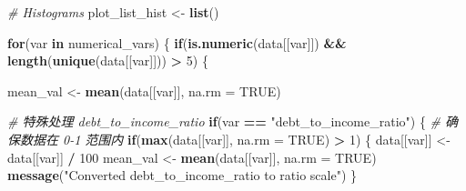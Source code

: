\documentclass[
]{article}
\newenvironment{Shaded}{\begin{snugshade}}{\end{snugshade}}
\newcommand{\AttributeTok}[1]{\textcolor[rgb]{0.13,0.29,0.53}{#1}}
\newcommand{\CommentTok}[1]{\textcolor[rgb]{0.56,0.35,0.01}{\textit{#1}}}
\newcommand{\ConstantTok}[1]{\textcolor[rgb]{0.56,0.35,0.01}{#1}}
\newcommand{\ControlFlowTok}[1]{\textcolor[rgb]{0.13,0.29,0.53}{\textbf{#1}}}
\newcommand{\DecValTok}[1]{\textcolor[rgb]{0.00,0.00,0.81}{#1}}
\newcommand{\FunctionTok}[1]{\textcolor[rgb]{0.13,0.29,0.53}{\textbf{#1}}}
\newcommand{\NormalTok}[1]{#1}
\newcommand{\OtherTok}[1]{\textcolor[rgb]{0.56,0.35,0.01}{#1}}
\newcommand{\SpecialCharTok}[1]{\textcolor[rgb]{0.81,0.36,0.00}{\textbf{#1}}}
\newcommand{\StringTok}[1]{\textcolor[rgb]{0.31,0.60,0.02}{#1}}
\begin{document}
\begin{Shaded}
\begin{Highlighting}[]
\CommentTok{\# Histograms}
\NormalTok{plot\_list\_hist }\OtherTok{\textless{}{-}} \FunctionTok{list}\NormalTok{()}

\ControlFlowTok{for}\NormalTok{(var }\ControlFlowTok{in}\NormalTok{ numerical\_vars) \{}
  \ControlFlowTok{if}\NormalTok{(}\FunctionTok{is.numeric}\NormalTok{(data[[var]]) }\SpecialCharTok{\&\&} \FunctionTok{length}\NormalTok{(}\FunctionTok{unique}\NormalTok{(data[[var]])) }\SpecialCharTok{\textgreater{}} \DecValTok{5}\NormalTok{) \{}
    
\NormalTok{    mean\_val }\OtherTok{\textless{}{-}} \FunctionTok{mean}\NormalTok{(data[[var]], }\AttributeTok{na.rm =} \ConstantTok{TRUE}\NormalTok{)}
    
    \CommentTok{\# 特殊处理 debt\_to\_income\_ratio}
    \ControlFlowTok{if}\NormalTok{(var }\SpecialCharTok{==} \StringTok{"debt\_to\_income\_ratio"}\NormalTok{) \{}
      \CommentTok{\# 确保数据在 0{-}1 范围内}
      \ControlFlowTok{if}\NormalTok{(}\FunctionTok{max}\NormalTok{(data[[var]], }\AttributeTok{na.rm =} \ConstantTok{TRUE}\NormalTok{) }\SpecialCharTok{\textgreater{}} \DecValTok{1}\NormalTok{) \{}
\NormalTok{        data[[var]] }\OtherTok{\textless{}{-}}\NormalTok{ data[[var]] }\SpecialCharTok{/} \DecValTok{100}
\NormalTok{        mean\_val }\OtherTok{\textless{}{-}} \FunctionTok{mean}\NormalTok{(data[[var]], }\AttributeTok{na.rm =} \ConstantTok{TRUE}\NormalTok{)}
        \FunctionTok{message}\NormalTok{(}\StringTok{"Converted debt\_to\_income\_ratio to ratio scale"}\NormalTok{)}
\NormalTok{      \}}
      

\end{Highlighting}
\end{Shaded}
\end{document}
